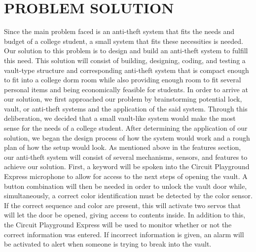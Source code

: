 \documentclass[12pt]{article}
\begin{document}
\section{PROBLEM SOLUTION}

Since the main problem faced is an anti-theft system that fits the needs and budget of a college student, a small system that fits these necessities is needed. Our solution to this problem is to design and build an anti-theft system to fulfill this need. This solution will consist of building, designing, coding, and testing a vault-type structure and corresponding anti-theft system that is compact enough to fit into a college dorm room while also providing enough room to fit several personal items and being economically feasible for students.
In order to arrive at our solution, we first approached our problem by brainstorming potential lock, vault, or anti-theft systems and the application of the said system. Through this deliberation, we decided that a small vault-like system would make the most sense for the needs of a college student. After determining the application of our solution, we began the design process of how the system would work and a rough plan of how the setup would look.
As mentioned above in the features section, our anti-theft system will consist of several mechanisms, sensors, and features to achieve our solution. First, a keyword will be spoken into the Circuit Playground Express microphone to allow for access to the next steps of opening the vault. A button combination will then be needed in order to unlock the vault door while, simultaneously, a correct color identification must be detected by the color sensor. If the correct sequence and color are present, this will activate two servos that will let the door be opened, giving access to contents inside. In addition to this, the Circuit Playground Express will be used to monitor whether or not the correct information was entered. If incorrect information is given, an alarm will be activated to alert when someone is trying to break into the vault.
\end{document}

